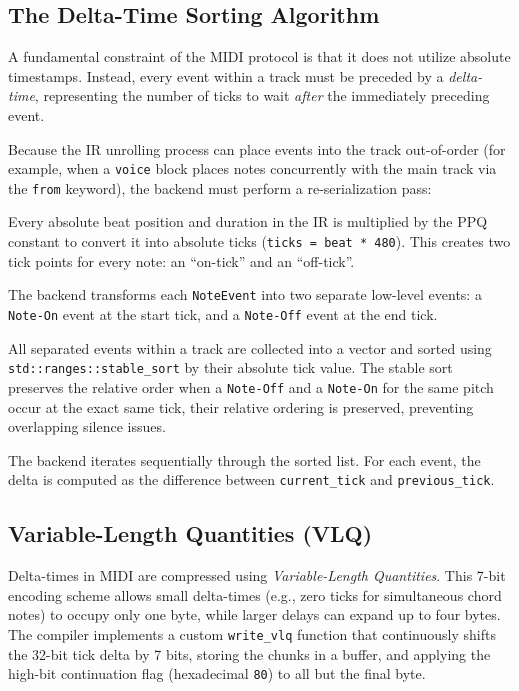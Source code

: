 \subsection{The Delta-Time Sorting Algorithm}\label{detail-subsec:the-delta-time-sorting-algorithm}

A fundamental constraint of the MIDI protocol is that it does not utilize absolute timestamps.
Instead, every event within a track must be preceded by a \textit{delta-time}, representing the number of ticks to wait
\textit{after} the immediately preceding event.

Because the IR unrolling process can place events into the track out-of-order (for example, when a \texttt{voice} block
places notes concurrently with the main track via the \texttt{from} keyword), the backend must perform a
re-serialization pass:

 Every absolute beat position and duration in the IR is multiplied by the
PPQ constant
to convert it into absolute ticks (\texttt{ticks = beat * 480}).
This creates two tick points for every note: an ``on-tick'' and an ``off-tick''.

 The backend transforms each \texttt{NoteEvent} into two separate
low-level events: a
\texttt{Note-On} event at the start tick, and a \texttt{Note-Off} event at the end tick.

 All separated events within a track are collected into a vector and sorted using
\texttt{std::ranges::stable\_sort} by their absolute tick value.
The stable sort preserves the relative order when a \texttt{Note-Off} and a \texttt{Note-On} for the same
pitch occur at the exact
same tick, their relative ordering is preserved, preventing overlapping silence issues.

 The backend iterates sequentially through the sorted list.
For each event, the delta is computed as the difference between \texttt{current\_tick} and
\texttt{previous\_tick}.

\subsection{Variable-Length Quantities (VLQ)}\label{detail-subsec:variable-length-quantities-(vlq)}

Delta-times in MIDI are compressed using \textit{Variable-Length Quantities}.
This 7-bit encoding scheme allows small delta-times (e.g., zero ticks for simultaneous chord notes) to occupy only one
byte, while larger delays can expand up to four bytes.
The compiler implements a custom \texttt{write\_vlq} function that continuously shifts the 32-bit tick delta by 7 bits,
storing the chunks in a buffer, and applying the high-bit continuation flag (hexadecimal \texttt{80}) to all but the
final byte.

